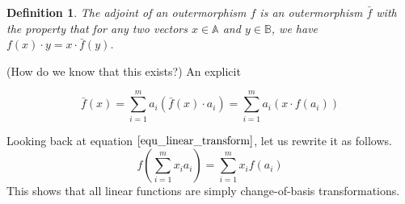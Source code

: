 \documentclass[12pt]{article}
\newcommand{\A}{\mathbb{A}}
\newcommand{\B}{\mathbb{B}}
\newtheorem{definition}{Definition}[section]
\begin{document}
\begin{definition}
The adjoint of an outermorphism $f$ is an outermorphism $\bar{f}$ with the property that
for any two vectors $x\in\A$ and $y\in\B$, we have $f(x)\cdot y= x\cdot \bar{f}(y)$.
\end{definition}
(How do we know that this exists?)  An explicit 

\begin{equation*}
\bar{f}(x) = \sum_{i=1}^m a_i(\bar{f}(x)\cdot a_i) = \sum_{i=1}^m a_i(x\cdot f(a_i))
\end{equation*}

Looking back at equation $\eqref{equ_linear_transform}$, let us rewrite it as follows.
\begin{equation*}
f\left(\sum_{i=1}^m x_i a_i\right) = \sum_{i=1}^m x_i f(a_i)
\end{equation*}
This shows that all linear functions are simply change-of-basis transformations.
\end{document}
